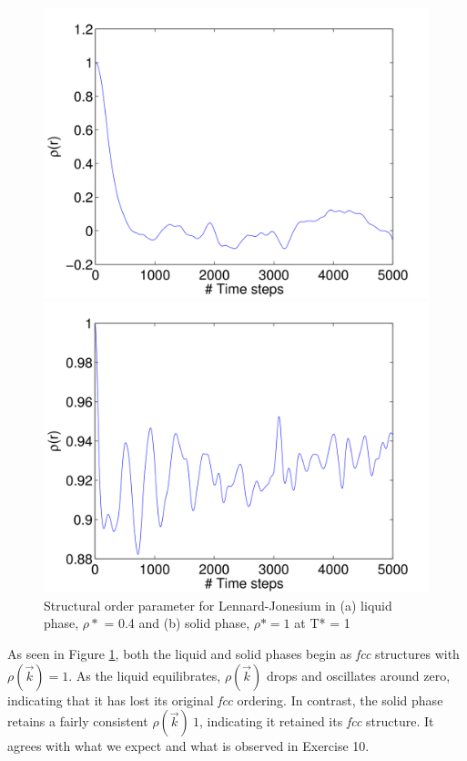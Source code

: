 \documentclass[12pt, oneside]{article}
\begin{document}
\begin{figure}
\begin{minipage}[!htbp]{.5\linewidth}
\includegraphics[width=\textwidth]{./figs/ex11-rho-liq.png}
\subcaption{}
\end{minipage}
\begin{minipage}[!htbp]{.5\linewidth}
\includegraphics[width=\textwidth]{./figs/ex11-rho-sol.png}
\subcaption{}
\end{minipage}
\caption{Structural order parameter for Lennard-Jonesium in (a) liquid phase, $\rho*$ = 0.4 and  (b) solid phase, $\rho* = 1$ at T* = 1}
\label{fig:rho}
\end{figure}

As seen in Figure \ref{fig:rho}, both the liquid and solid phases begin as \textit{fcc} structures with $\rho(\vec{k}) = 1$. As the liquid equilibrates, $\rho(\vec{k})$ drops and oscillates around zero, indicating that it has lost its original \textit{fcc} ordering. In contrast, the solid phase retains a fairly consistent $\rho(\vec{k}) ~ 1 $, indicating it retained its \textit{fcc} structure. It agrees with what we expect and what is observed in Exercise 10. 
\end{document}
